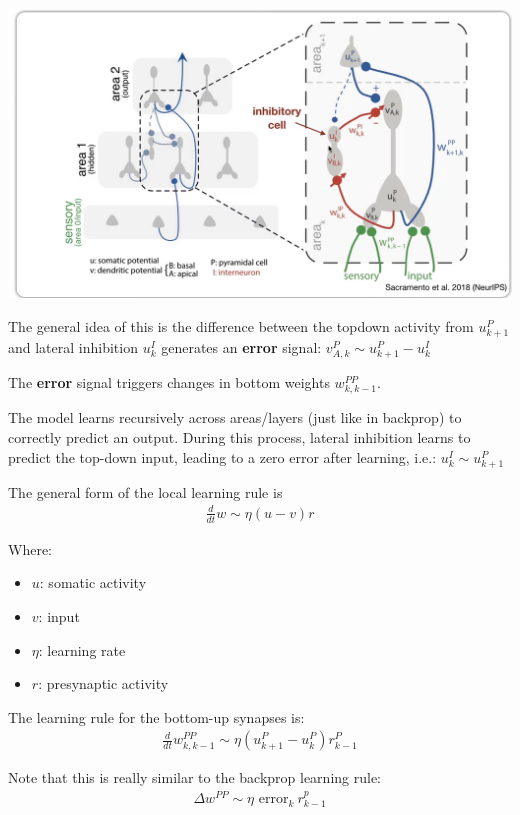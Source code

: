\documentclass[11pt,a4paper,titlepage,dvipsnames,cmyk]{scrartcl}
\begin{document}
\begin{center}
\includegraphics[scale=.4]{pics/dendritic.png}
\end{center}

The general idea of this is the difference between the topdown activity from $u_{k+1}^P$ and lateral inhibition $u_k^I$ generates an \textbf{error} signal: $v_{A,k}^P \sim u_{k+1}^P - u_k^I$

The \textbf{error} signal triggers changes in bottom weights $w_{k,k-1}^{PP}$.

The model learns recursively across areas/layers (just like in backprop) to correctly predict an output. During this process, lateral inhibition learns to predict the top-down input, leading to a zero error after learning, i.e.: $u_k^I \sim u_{k+1}^P$

The general form of the local learning rule is
\begin{align*}
\frac{d}{dt}w \sim \eta (u-v)r
\end{align*}

Where:
\begin{itemize}
    \item $u$: somatic activity
    \item $v$: input
    \item $\eta$: learning rate
    \item $r$: presynaptic activity
\end{itemize}

The learning rule for the bottom-up synapses is:
\begin{align*}
\frac{d}{dt}w_{k,k-1}^{PP} \sim \eta (u_{k+1}^P - u_k^P)r_{k-1}^P
\end{align*}

Note that this is really similar to the backprop learning rule:
\begin{align*}
\Delta w^{PP} \sim \eta \text{ error}_k \ r_{k-1}^p
\end{align*}
\end{document}
